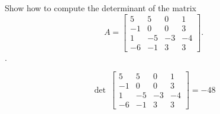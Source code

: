 
\begin{exerciseStatement}


Show how to compute the determinant of the matrix \[A= \left[\begin{array}{cccc}
5 & 5 & 0 & 1 \\
-1 & 0 & 0 & 3 \\
1 & -5 & -3 & -4 \\
-6 & -1 & 3 & 3
\end{array}\right] .\].


\end{exerciseStatement}
    
\begin{exerciseAnswer} 
\[\operatorname{det}\  \left[\begin{array}{cccc}
5 & 5 & 0 & 1 \\
-1 & 0 & 0 & 3 \\
1 & -5 & -3 & -4 \\
-6 & -1 & 3 & 3
\end{array}\right] = -48 \]
\end{exerciseAnswer}
    

